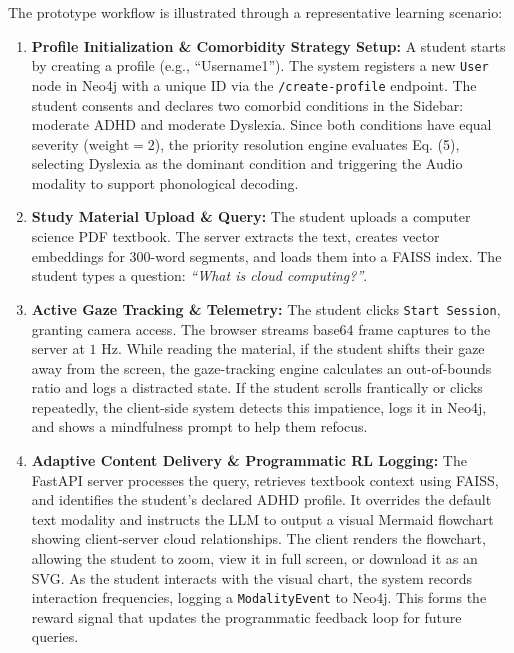 \documentclass[final,5p,times,twocolumn,authoryear]{elsarticle}
\begin{document}
The prototype workflow is illustrated through a representative learning scenario:
\begin{enumerate}
    \item \textbf{Profile Initialization \& Comorbidity Strategy Setup:}
    A student starts by creating a profile (e.g., ``Username1''). The system registers a new \texttt{User} node in Neo4j with a unique ID via the \texttt{/create-profile} endpoint. The student consents and declares two comorbid conditions in the Sidebar: moderate ADHD and moderate Dyslexia. Since both conditions have equal severity ($\text{weight}=2$), the priority resolution engine evaluates Eq. (5), selecting Dyslexia as the dominant condition and triggering the Audio modality to support phonological decoding.
    
    \item \textbf{Study Material Upload \& Query:}
    The student uploads a computer science PDF textbook. The server extracts the text, creates vector embeddings for 300-word segments, and loads them into a FAISS index. The student types a question: \textit{``What is cloud computing?''}.
    
    \item \textbf{Active Gaze Tracking \& Telemetry:}
    The student clicks \texttt{Start Session}, granting camera access. The browser streams base64 frame captures to the server at $1\text{ Hz}$. While reading the material, if the student shifts their gaze away from the screen, the gaze-tracking engine calculates an out-of-bounds ratio and logs a distracted state. If the student scrolls frantically or clicks repeatedly, the client-side system detects this impatience, logs it in Neo4j, and shows a mindfulness prompt to help them refocus.
    
    \item \textbf{Adaptive Content Delivery \& Programmatic RL Logging:}
    The FastAPI server processes the query, retrieves textbook context using FAISS, and identifies the student's declared ADHD profile. It overrides the default text modality and instructs the LLM to output a visual Mermaid flowchart showing client-server cloud relationships. The client renders the flowchart, allowing the student to zoom, view it in full screen, or download it as an SVG.
    As the student interacts with the visual chart, the system records interaction frequencies, logging a \texttt{ModalityEvent} to Neo4j. This forms the reward signal that updates the programmatic feedback loop for future queries.
    

\end{enumerate}
\end{document}
